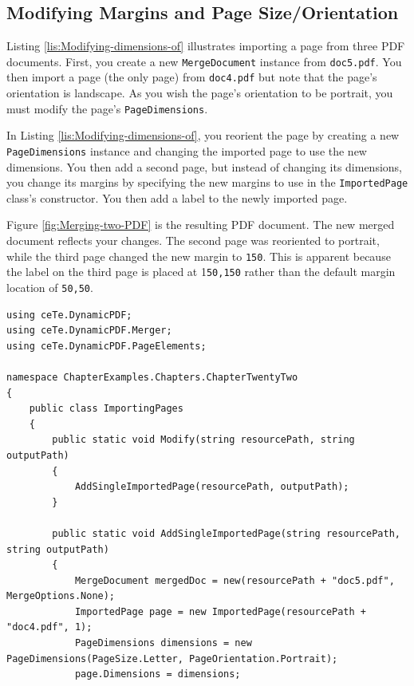 \documentclass[american,letterpaper]{tufte-book}
\numberwithin{equation}{section}
\numberwithin{figure}{section}
\begin{document}
{{\subsection{Modifying Margins and Page Size/Orientation}

Listing \ref{lis:Modifying-dimensions-of} illustrates importing a
page from three PDF documents. First, you create a new \texttt{MergeDocument}
instance from \texttt{doc5.pdf}. You then import a page (the only
page) from \texttt{doc4.pdf} but note that the page's orientation
is landscape. As you wish the page's orientation to be portrait, you
must modify the page's \texttt{PageDimensions}.

In Listing \ref{lis:Modifying-dimensions-of}, you reorient the page
by creating a new \texttt{PageDimensions} instance and changing the
imported page to use the new dimensions. You then add a second page,
but instead of changing its dimensions, you change its margins by
specifying the new margins to use in the \texttt{ImportedPage} class's
constructor. You then add a label to the newly imported page. 

Figure \ref{fig:Merging-two-PDF} is the resulting PDF document. The
new merged document reflects your changes. The second page was reoriented
to portrait, while the third page changed the new margin to \texttt{150}.
This is apparent because the label on the third page is placed at
1\texttt{50,150} rather than the default margin location of \texttt{50,50}.

\bgroup{}
\begin{lstlisting}[caption={Modifying dimensions of imported page.},label={lis:Modifying-dimensions-of},basicstyle={\small\ttfamily},breaklines=true]
using ceTe.DynamicPDF;
using ceTe.DynamicPDF.Merger;
using ceTe.DynamicPDF.PageElements;

namespace ChapterExamples.Chapters.ChapterTwentyTwo
{
    public class ImportingPages
    {
        public static void Modify(string resourcePath, string outputPath)
        {
            AddSingleImportedPage(resourcePath, outputPath);
        }

        public static void AddSingleImportedPage(string resourcePath, string outputPath)
        {
            MergeDocument mergedDoc = new(resourcePath + "doc5.pdf", MergeOptions.None);
            ImportedPage page = new ImportedPage(resourcePath + "doc4.pdf", 1);
            PageDimensions dimensions = new PageDimensions(PageSize.Letter, PageOrientation.Portrait);
            page.Dimensions = dimensions;


\end{lstlisting}}}
\end{document}

